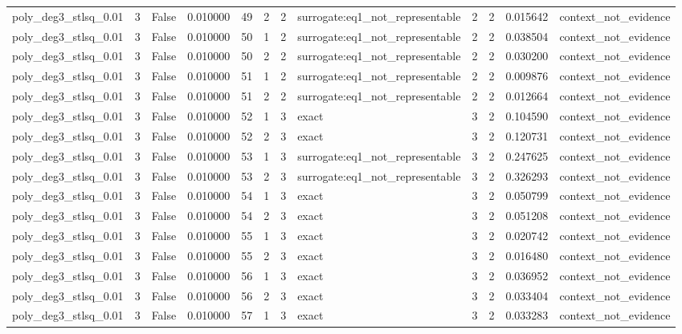 \begin{tabular}{lrrrrrrlrrrl}
poly\_deg3\_stlsq\_0.01 & 3 & False & 0.010000 & 49 & 2 & 2 & surrogate:eq1\_not\_representable & 2 & 2 & 0.015642 & context\_not\_evidence \\
poly\_deg3\_stlsq\_0.01 & 3 & False & 0.010000 & 50 & 1 & 2 & surrogate:eq1\_not\_representable & 2 & 2 & 0.038504 & context\_not\_evidence \\
poly\_deg3\_stlsq\_0.01 & 3 & False & 0.010000 & 50 & 2 & 2 & surrogate:eq1\_not\_representable & 2 & 2 & 0.030200 & context\_not\_evidence \\
poly\_deg3\_stlsq\_0.01 & 3 & False & 0.010000 & 51 & 1 & 2 & surrogate:eq1\_not\_representable & 2 & 2 & 0.009876 & context\_not\_evidence \\
poly\_deg3\_stlsq\_0.01 & 3 & False & 0.010000 & 51 & 2 & 2 & surrogate:eq1\_not\_representable & 2 & 2 & 0.012664 & context\_not\_evidence \\
poly\_deg3\_stlsq\_0.01 & 3 & False & 0.010000 & 52 & 1 & 3 & exact & 3 & 2 & 0.104590 & context\_not\_evidence \\
poly\_deg3\_stlsq\_0.01 & 3 & False & 0.010000 & 52 & 2 & 3 & exact & 3 & 2 & 0.120731 & context\_not\_evidence \\
poly\_deg3\_stlsq\_0.01 & 3 & False & 0.010000 & 53 & 1 & 3 & surrogate:eq1\_not\_representable & 3 & 2 & 0.247625 & context\_not\_evidence \\
poly\_deg3\_stlsq\_0.01 & 3 & False & 0.010000 & 53 & 2 & 3 & surrogate:eq1\_not\_representable & 3 & 2 & 0.326293 & context\_not\_evidence \\
poly\_deg3\_stlsq\_0.01 & 3 & False & 0.010000 & 54 & 1 & 3 & exact & 3 & 2 & 0.050799 & context\_not\_evidence \\
poly\_deg3\_stlsq\_0.01 & 3 & False & 0.010000 & 54 & 2 & 3 & exact & 3 & 2 & 0.051208 & context\_not\_evidence \\
poly\_deg3\_stlsq\_0.01 & 3 & False & 0.010000 & 55 & 1 & 3 & exact & 3 & 2 & 0.020742 & context\_not\_evidence \\
poly\_deg3\_stlsq\_0.01 & 3 & False & 0.010000 & 55 & 2 & 3 & exact & 3 & 2 & 0.016480 & context\_not\_evidence \\
poly\_deg3\_stlsq\_0.01 & 3 & False & 0.010000 & 56 & 1 & 3 & exact & 3 & 2 & 0.036952 & context\_not\_evidence \\
poly\_deg3\_stlsq\_0.01 & 3 & False & 0.010000 & 56 & 2 & 3 & exact & 3 & 2 & 0.033404 & context\_not\_evidence \\
poly\_deg3\_stlsq\_0.01 & 3 & False & 0.010000 & 57 & 1 & 3 & exact & 3 & 2 & 0.033283 & context\_not\_evidence \\

\end{tabular}
